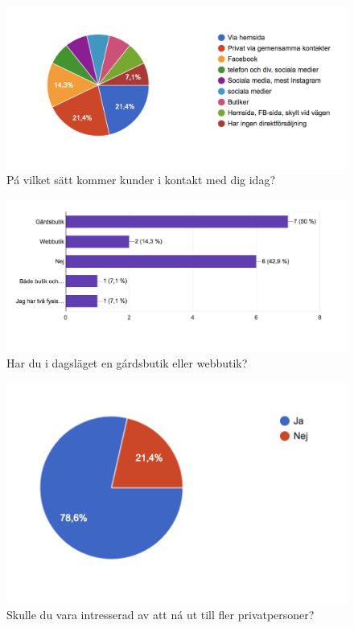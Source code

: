 \documentclass[10pt,a4paper,oneside]{article}
\begin{document}
\begin{figure}
	\includegraphics[scale=0.6]{4.png}
	\caption{P\'a vilket s\"att kommer kunder i kontakt med dig idag?}
\end{figure}

\begin{figure}
	\includegraphics[scale=0.6]{5.png}
	\caption{Har du i dagsl\"aget en g\'ardsbutik eller webbutik?}
\end{figure}

\begin{figure}
	\includegraphics[scale=0.6]{6.png}
	\caption{Skulle du vara intresserad av att n\'a ut till fler privatpersoner?}
\end{figure}
\end{document}
